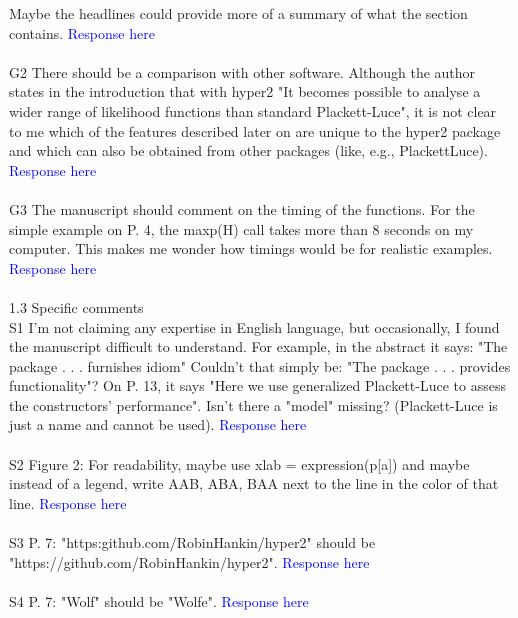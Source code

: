 \documentclass[12pt]{article}
\begin{document}
Maybe the headlines could provide more of a summary of what the section
contains.
\textcolor{blue}{Response here}\\ \\



G2 There should be a comparison with other software. Although the author
states in the introduction that with hyper2 "It becomes possible to analyse
a wider range of likelihood functions than standard Plackett-Luce", it is
not clear to me which of the features described later on are unique to the
hyper2 package and which can also be obtained from other packages (like,
e.g., PlackettLuce).
\textcolor{blue}{Response here}\\ \\


G3 The manuscript should comment on the timing of the functions. For the
simple example on P. 4, the maxp(H) call takes more than 8 seconds on
my computer. This makes me wonder how timings would be for realistic
examples.
\textcolor{blue}{Response here}\\ \\



1.3 Specific comments\\
S1 I'm not claiming any expertise in English language, but occasionally, I found
the manuscript difficult to understand. For example, in the abstract it
says: "The package . . . furnishes idiom" Couldn't that simply be: "The
package . . . provides functionality"? On P. 13, it says "Here we use generalized
Plackett-Luce to assess the constructors' performance". Isn't there
a "model" missing? (Plackett-Luce is just a name and cannot be used).
\textcolor{blue}{Response here}\\ \\


S2 Figure 2: For readability, maybe use xlab = expression(p[a]) and maybe
instead of a legend, write AAB, ABA, BAA next to the line in the color
of that line.
\textcolor{blue}{Response here}\\ \\


S3 P. 7: "https:github.com/RobinHankin/hyper2" should be
"https://github.com/RobinHankin/hyper2".
\textcolor{blue}{Response here}\\ \\


S4 P. 7: "Wolf" should be "Wolfe".
\textcolor{blue}{Response here}\\ \\
\end{document}
